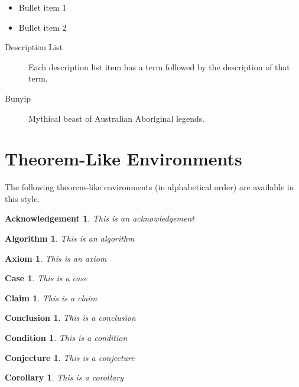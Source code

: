 \documentclass[letterpaper,12pt,openany,reqno]{book}%
\newtheorem{acknowledgement}[theorem]{Acknowledgement}
\newtheorem{algorithm}[theorem]{Algorithm}
\newtheorem{axiom}[theorem]{Axiom}
\newtheorem{case}[theorem]{Case}
\newtheorem{claim}[theorem]{Claim}
\newtheorem{conclusion}[theorem]{Conclusion}
\newtheorem{condition}[theorem]{Condition}
\newtheorem{conjecture}[theorem]{Conjecture}
\newtheorem{corollary}[theorem]{Corollary}
\begin{document}
\begin{itemize}
\item Bullet item 1

\item Bullet item 2

\end{itemize}

\begin{description}
\item[Description List] Each description list item has a term followed by the
description of that term.

\item[Bunyip] Mythical beast of Australian Aboriginal legends.
\end{description}

\section{Theorem-Like Environments}

The following theorem-like environments (in alphabetical order) are available
in this style.

\begin{acknowledgement}
This is an acknowledgement
\end{acknowledgement}

\begin{algorithm}
This is an algorithm
\end{algorithm}

\begin{axiom}
This is an axiom
\end{axiom}

\begin{case}
This is a case
\end{case}

\begin{claim}
This is a claim
\end{claim}

\begin{conclusion}
This is a conclusion
\end{conclusion}

\begin{condition}
This is a condition
\end{condition}

\begin{conjecture}
This is a conjecture
\end{conjecture}

\begin{corollary}
This is a corollary
\end{corollary}
\end{document}
